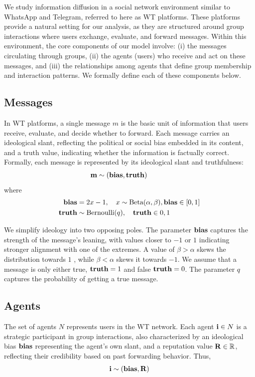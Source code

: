 
We study information diffusion in a social network environment similar to WhatsApp and Telegram, referred to here as WT platforms.
These platforms provide a natural setting for our analysis, as they are structured around group 
interactions where users exchange, evaluate, and forward messages. Within this environment, the 
core components of our model involve: (i) the messages circulating through groups, (ii) the agents 
(users) who receive and act on these messages, and (iii) the relationships among agents that define 
group membership and interaction patterns. We formally define each of these components below.

\subsection{Messages}
In WT platforms, a single message $m$ is the basic unit of information that users receive, 
evaluate, and decide whether to forward. Each message carries an ideological slant, reflecting 
the political or social bias embedded in its content, and a truth value, indicating whether the 
information is factually correct. Formally, each message is represented by its ideological slant and truthfulness:
\begin{align}
\mathbf{m} &\sim (\mathbf{bias}, \mathbf{truth}) \qquad  
\end{align}
where
\begin{align}
\mathbf{bias} &= 2x - 1,\quad x \sim \text{Beta}(\alpha, \beta), \mathbf{bias} \in [0,1] \\
\mathbf{truth} &\sim \text{Bernoulli}(q), \quad \mathbf{truth} \in {0,1}
\end{align}

We simplify ideology into two opposing poles. The parameter $\mathbf{bias}$ captures the strength of 
the message’s leaning, with values closer to $-1$ or $1$ indicating stronger alignment with 
one of the extremes.  A value of $\beta > \alpha$ skews the distribution towards  $1$ , while $\beta < \alpha$ skews it towards $-1$. We assume that a message is only either true, $\mathbf{truth}=1$ and false $\mathbf{truth}=0$. The parameter $q$ captures the probability of getting a true message. 
\subsection{Agents}

The set of agents $N$ represents users in the WT network. Each agent $\mathbf{i} \in N$ is a strategic 
participant in group interactions, also characterized by an ideological bias $\mathbf{bias}$ representing 
the agent’s own slant, and a reputation value $\mathbf{R} \in \mathbb{R}$, reflecting their credibility 
based on past forwarding behavior. Thus,
\begin{equation}
\mathbf{i} \sim (\mathbf{bias}, \mathbf{R})
\end{equation}

